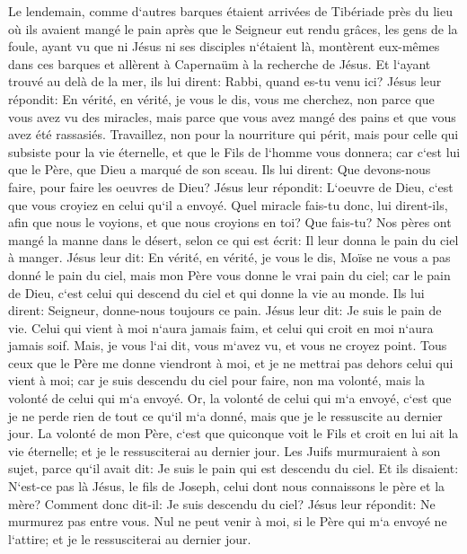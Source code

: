 \verse Le lendemain, comme d`autres barques étaient arrivées de Tibériade près du lieu où ils avaient mangé le pain après que le Seigneur eut rendu grâces, 
\verse les gens de la foule, ayant vu que ni Jésus ni ses disciples n`étaient là, montèrent eux-mêmes dans ces barques et allèrent à Capernaüm à la recherche de Jésus. 
\verse Et l`ayant trouvé au delà de la mer, ils lui dirent: Rabbi, quand es-tu venu ici? 
\verse Jésus leur répondit: En vérité, en vérité, je vous le dis, vous me cherchez, non parce que vous avez vu des miracles, mais parce que vous avez mangé des pains et que vous avez été rassasiés. 
\verse Travaillez, non pour la nourriture qui périt, mais pour celle qui subsiste pour la vie éternelle, et que le Fils de l`homme vous donnera; car c`est lui que le Père, que Dieu a marqué de son sceau. 
\verse Ils lui dirent: Que devons-nous faire, pour faire les oeuvres de Dieu? 
\verse Jésus leur répondit: L`oeuvre de Dieu, c`est que vous croyiez en celui qu`il a envoyé. 
\verse Quel miracle fais-tu donc, lui dirent-ils, afin que nous le voyions, et que nous croyions en toi? Que fais-tu? 
\verse Nos pères ont mangé la manne dans le désert, selon ce qui est écrit: Il leur donna le pain du ciel à manger. 
\verse Jésus leur dit: En vérité, en vérité, je vous le dis, Moïse ne vous a pas donné le pain du ciel, mais mon Père vous donne le vrai pain du ciel; 
\verse car le pain de Dieu, c`est celui qui descend du ciel et qui donne la vie au monde. 
\verse Ils lui dirent: Seigneur, donne-nous toujours ce pain. 
\verse Jésus leur dit: Je suis le pain de vie. Celui qui vient à moi n`aura jamais faim, et celui qui croit en moi n`aura jamais soif. 
\verse Mais, je vous l`ai dit, vous m`avez vu, et vous ne croyez point. 
\verse Tous ceux que le Père me donne viendront à moi, et je ne mettrai pas dehors celui qui vient à moi; 
\verse car je suis descendu du ciel pour faire, non ma volonté, mais la volonté de celui qui m`a envoyé. 
\verse Or, la volonté de celui qui m`a envoyé, c`est que je ne perde rien de tout ce qu`il m`a donné, mais que je le ressuscite au dernier jour. 
\verse La volonté de mon Père, c`est que quiconque voit le Fils et croit en lui ait la vie éternelle; et je le ressusciterai au dernier jour. 
\verse Les Juifs murmuraient à son sujet, parce qu`il avait dit: Je suis le pain qui est descendu du ciel. 
\verse Et ils disaient: N`est-ce pas là Jésus, le fils de Joseph, celui dont nous connaissons le père et la mère? Comment donc dit-il: Je suis descendu du ciel? 
\verse Jésus leur répondit: Ne murmurez pas entre vous. 
\verse Nul ne peut venir à moi, si le Père qui m`a envoyé ne l`attire; et je le ressusciterai au dernier jour. 
